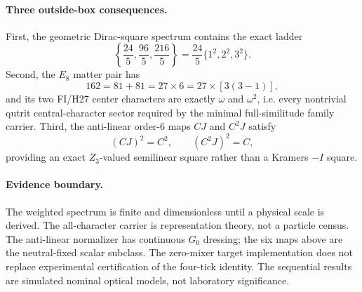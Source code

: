 \paragraph{Three outside-box consequences.}
First, the geometric Dirac-square spectrum contains the exact ladder
\[
\boxed{
\left\{
\frac{24}{5},
\frac{96}{5},
\frac{216}{5}
\right\}
=
\frac{24}{5}\{1^2,2^2,3^2\}.
}
\]
Second, the $E_8$ matter pair has
\[
\boxed{
162=81+81=27\times6
=27\times[3(3-1)],
}
\]
and its two FI/H27 center characters are exactly $\omega$ and $\omega^2$,
i.e. every nontrivial qutrit central-character sector required by the minimal
full-similitude family carrier.  Third, the anti-linear order-$6$ maps
$CJ$ and $C^2J$ satisfy
\[
(CJ)^2=C^2,
\qquad
(C^2J)^2=C,
\]
providing an exact $Z_3$-valued semilinear square rather than a Kramers
$-I$ square.

\paragraph{Evidence boundary.}
The weighted spectrum is finite and dimensionless until a physical scale is
derived.  The all-character carrier is representation theory, not a particle
census.  The anti-linear normalizer has continuous $G_0$ dressing; the six
maps above are the neutral-fixed scalar subclass.  The zero-mixer target
implementation does not replace experimental certification of the four-tick
identity.  The sequential results are simulated nominal optical models, not
laboratory significance.
